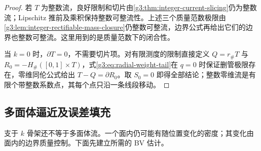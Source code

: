\begin{proof}
	若 \(T\) 为整数流，良好限制和切片由\cref{g3:thm:integer-current-slicing}仍为整数流；Lipschitz 推前及乘积保持整数可整流性。上述三个质量范数极限由\cref{g3:lem:integer-rectifiable-mass-closure}仍整数可整流，边界公式再给出它们的边界也整数可整流。这里用到的是质量范数下的闭合性。

	当 \(k=0\) 时，\(\partial T=0\)，不需要切片项。对有限测度的限制直接定义 \(Q=r_\#T\) 与 \(R_0=-H_\#([0,1]\times T)\)，式\eqref{g3:eq:radial-weight-tail}在 \(q=0\) 时保证删管极限存在，零维同伦公式给出 \(T-Q=\partial R_0\)。取 \(S_0=0\) 即得全部结论；整数零维流是有限个带整数系数点，其每个点只沿一条线段移动。
\end{proof}

\subsection{多面体逼近及误差填充}
\label{g3:subsec:2204:03}
支于 \(k\) 骨架还不等于多面体流。一个面内仍可能有随位置变化的密度；其变化由面内的边界质量控制。下面先建立所需的 BV 估计。

